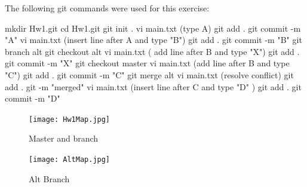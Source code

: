 \documentclass[12pt]{article}
\begin{document}
The following git commands were used for this exercise:

 mkdir Hw1.git\newline
 cd Hw1.git\newline
 git init .\newline
 vi main.txt  (type A)\newline
 git add . \newline
 git commit -m "A" \newline
 vi main.txt  (insert line after A and type "B")
\newline
 git add . \newline
 git commit -m "B"\newline
 git branch alt \newline
 git checkout alt \newline
 vi main.txt ( add line after B and type "X")
\newline
 git add . \newline
 git commit -m "X" \newline
 git checkout master\newline
 vi main.txt (add line after B and type "C")
  \newline
 git add . \newline 
 git commit -m "C" \newline
 git merge alt \newline
 vi main.txt  (resolve conflict)
\newline
 git add .\newline
 git -m "merged" \newline
 vi main.txt (insert line after C and type "D" )
\newline
 git add .
\newline
 git commit -m "D"

\begin{figure}[h]
    \begin{center}
        \texttt{[image: Hw1Map.jpg]}
    \end{center}
    \caption{Master and branch}
    \label{fig:Hw1Map}
\end{figure}

\begin{figure}[h]
    \begin{center}
        \texttt{[image: AltMap.jpg]}
    \end{center}
    \caption{Alt Branch}
    \label{fig:Hw1Map}
\end{figure}
\end{document}
